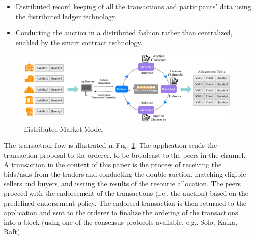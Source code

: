 \begin{itemize}
    \item Distributed record keeping of all the transactions and participants' data using the distributed ledger technology.
    \item Conducting the auction in a distributed fashion rather than centralized, enabled by the smart contract technology.
\end{itemize}

\begin{figure}
    \centering
    \includegraphics[width=0.99\textwidth]{Figures/figil.eps}
    \caption{Distributed Market Model}
    \label{fig:flow}
\end{figure}


The transaction flow is illustrated in Fig.~\ref{fig:flow}. The application sends the transaction proposal to the orderer, to be broadcast to the peers in the channel. A transaction in the context of this paper is the process of receiving the bids/asks from the traders and conducting the double auction, matching eligible sellers and buyers, and issuing the results of the resource allocation. The peers proceed with the endorsement of the transactions (i.e., the auction) based on the predefined endorsement policy. The endorsed transaction is then returned to the application and sent to the orderer to finalize the ordering of the transactions into a block (using one of the consensus protocols available, e.g., Solo, Kafka, Raft).







